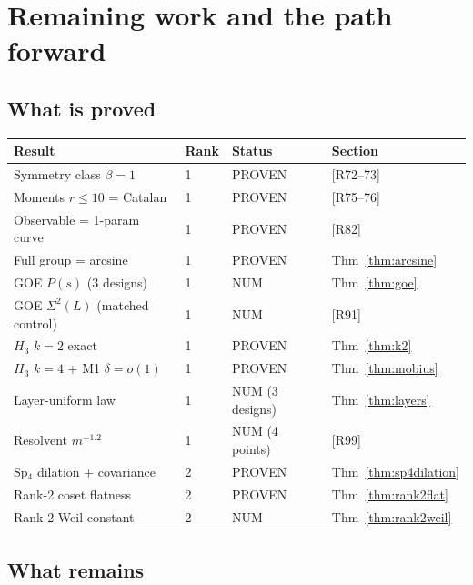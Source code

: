 \documentclass[11pt]{article}
\begin{document}
\section{Remaining work and the path forward}\label{sec:remaining}

\subsection{What is proved}

\begin{center}
\begin{tabular}{llll}
\toprule
Result & Rank & Status & Section\\
\midrule
Symmetry class $\beta = 1$ & 1 & PROVEN & [R72--73]\\
Moments $r \le 10$ = Catalan & 1 & PROVEN & [R75--76]\\
Observable = 1-param curve & 1 & PROVEN & [R82]\\
Full group = arcsine & 1 & PROVEN & Thm~\ref{thm:arcsine}\\
GOE $P(s)$ (3 designs) & 1 & NUM & Thm~\ref{thm:goe}\\
GOE $\Sigma^2(L)$ (matched control) & 1 & NUM & [R91]\\
$H_3$ $k{=}2$ exact & 1 & PROVEN & Thm~\ref{thm:k2}\\
$H_3$ $k{=}4$ + M1 $\delta = o(1)$ & 1 & PROVEN & Thm~\ref{thm:mobius}\\
Layer-uniform law & 1 & NUM (3 designs) & Thm~\ref{thm:layers}\\
Resolvent $m^{-1.2}$ & 1 & NUM (4 points) & [R99]\\
Sp$_4$ dilation + covariance & 2 & PROVEN & Thm~\ref{thm:sp4dilation}\\
Rank-2 coset flatness & 2 & PROVEN & Thm~\ref{thm:rank2flat}\\
Rank-2 Weil constant & 2 & NUM & Thm~\ref{thm:rank2weil}\\
\bottomrule
\end{tabular}
\end{center}

\subsection{What remains}
\end{document}
